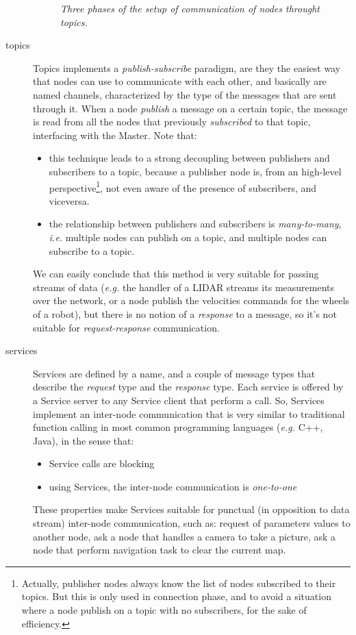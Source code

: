 \begin{description}
\begin{figure}
	\caption{\textit{Three phases of the setup of communication of nodes throught topics.}}
	\label{fig:topicRegistration}
\end{figure}


\item[topics] Topics implements a \textit{publish-subscribe} paradigm, are they the easiest way that nodes can use to communicate with each other, and basically are named channels, characterized by the type of the messages that are sent through it. When a node \textit{publish} a message on a certain topic, the message is read from all the nodes that previously \textit{subscribed} to that topic, interfacing with the Master. Note that:
\begin{itemize}
	\item this technique leads to a strong decoupling between publishers and subscribers to a topic, because a publisher node is, from an high-level perspective\footnote{Actually, publisher nodes always know the list of nodes subscribed to their topics. But this  is only used in connection phase, and to avoid a situation where a node publish on a topic with no subscribers, for the sake of efficiency.},
	not even aware of the presence of subscribers, and viceversa.
	\item the relationship between publishers and subscribers is \textit{many-to-many}, \textit{i.e.} multiple nodes can publish on a topic, and multiple nodes can subscribe to a topic.
\end{itemize}
We can easily conclude that this method is very suitable for passing streams of data (\textit{e.g.} the handler of a \ac{LIDAR} streams its measurements over the network, or a node publish the velocities commands for the wheels of a robot), but there is no notion of a \textit{response} to a message, so it's not suitable for \textit{request-response} communication. 


\item[services] Services are defined by a name, and a couple of message types that describe the \textit{request} type and the \textit{response} type. Each service is offered by a Service server to any Service client that perform a call. So, Services implement an inter-node communication that is very similar to traditional function calling in most common programming languages (\textit{e.g.} C++, Java), in the sense that:
\begin{itemize}
	\item Service calls are blocking
	\item using Services, the inter-node communication is \textit{one-to-one}
\end{itemize}
These properties make Services suitable for punctual (in opposition to data stream) inter-node communication, such as: request of parameters values to another node, ask a node that handles a camera to take a picture, ask a node that perform navigation task to clear the current map.


\end{description}
